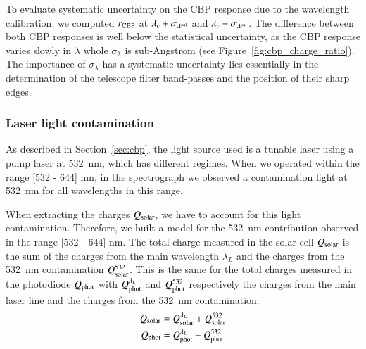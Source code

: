 To evaluate systematic uncertainty on the CBP response due to the wavelength calibration, we computed $r_{\rm CBP}$ at $\lambda_c+\sigma_{\lambda^{\rm cal}}$ and $\lambda_c-\sigma_{\lambda^{\rm cal}}$. The difference between both CBP responses is well below the statistical uncertainty, as the CBP response varies slowly in $\lambda$ whole $\sigma_\lambda$ is sub-Angstrom (see Figure~\ref{fig:cbp_charge_ratio}). The importance of $\sigma_\lambda$ has a systematic uncertainty lies essentially in the determination of the telescope filter band-passes and the position of their sharp edges.


\subsubsection{Laser light contamination}
\label{sec:532_cont}

As described in Section~\ref{sec:cbp}, the light source used is a tunable laser using a pump laser at \SI{532}{\nano\meter}, which has different regimes. When we operated within the range [532 - 644] nm, in the spectrograph  we observed a contamination light at \SI{532}{\nano\meter} for all wavelengths in this range. 

When extracting the charges $Q_{\mathrm{solar}}$, we have to account for this light contamination. Therefore, we built a model for the \SI{532}{\nano\meter} contribution observed in the range [532 - 644] nm. The total charge measured in the solar cell $Q_{\mathrm{solar}}$ is the sum of the charges from the main wavelength $\lambda_L$ and the charges from the \SI{532}{\nm} contamination $Q_{\mathrm{solar}}^{532}$. This is the same for the total charges measured in the photodiode $Q_{\mathrm{phot}}$ with $Q_{\mathrm{phot}}^{\lambda_L}$ and $Q_{\mathrm{phot}}^{532}$ respectively the charges from the main laser line and the charges from the \SI{532}{\nm} contamination:
\begin{align}
Q_{\mathrm{solar}} & = Q_{\mathrm{solar}}^{\lambda_L} + Q_{\mathrm{solar}}^{532} \label{eq:qsolar_mes} \\
Q_{\mathrm{phot}} & = Q_{\mathrm{phot}}^{\lambda_L} + Q_{\mathrm{phot}}^{532} \label{eq:qphot_mes}
\end{align}

